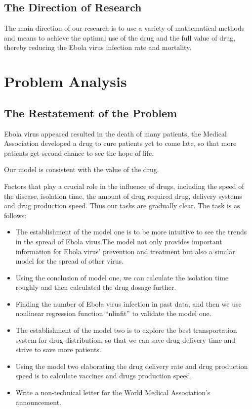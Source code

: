 \documentclass{icmmcm}
\begin{document}
\subsection{The Direction of Research}
The main direction of our research is to use a variety of
mathematical methods and means to achieve the optimal use 
of the drug and the full value of drug, thereby reducing the
Ebola virus infection rate and mortality.
\section{Problem Analysis}
\subsection{The Restatement of the Problem}
Ebola virus appeared resulted in the death of many patients,
the Medical Association developed a drug to cure patients yet
to come late, so that more patients get second chance to see
the hope of life.
\par Our  model is  consistent with the value of the drug.
\par Factors that play a crucial role in the influence of drugs,
including the speed of the disease, isolation time, the amount
of drug required drug, delivery systems and drug production
speed. Thus our tasks are gradually clear.
The task is as follows:
\begin{itemize}
  \item The establishment of the model one is to be more
  intuitive to see the trends in the spread of Ebola virus.The
  model not only provides important information for Ebola
  virus' prevention and treatment but also a similar model for
  the spread of other virus.
  \item Using the conclusion of model one, we can calculate the
  isolation time roughly and then calculated the drug dosage
  further.
  \item Finding the number of Ebola virus infection in past
  data, and then we use nonlinear regression function
  ``nlinfit'' to validate the model one.
  \item The establishment of the model two is to explore the
  best transportation system for drug distribution, so that we
  can save drug delivery time and strive to save more patients.
  \item Using the model two elaborating the drug delivery rate
  and drug production speed is to calculate vaccines and drugs
  production speed.
  \item Write a non-technical letter for the World Medical 
  Association's announcement.
\end{itemize}
\end{document}
